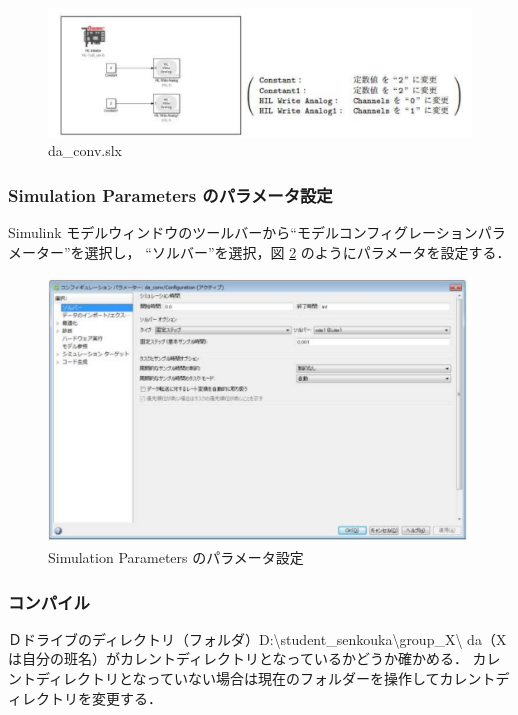     \begin{figure}[H]
        \centering
        \includegraphics[width=0.8\linewidth]{figure/da_conv.pdf}
        \caption{da\_conv.slx}
        \label{fig:da_conv}
    \end{figure}
    
    \subsubsection{Simulation Parameters のパラメータ設定}

    Simulink モデルウィンドウのツールバーから``モデルコンフィグレーションパラメーター''を選択し，
    ``ソルバー''を選択，図 \ref{fig:sim_param} のようにパラメータを設定する．
    
    \begin{figure}[H]
        \centering
        \includegraphics[width=0.8\linewidth]{figure/sim_param.pdf}
        \caption{Simulation Parameters のパラメータ設定}
        \label{fig:sim_param}
    \end{figure}
    
    \subsubsection{コンパイル}
    Ｄドライブのディレクトリ（フォルダ）D:\textbackslash student\_senkouka\textbackslash group\_X\textbackslash 
    da（Xは自分の班名）がカレントディレクトリとなっているかどうか確かめる．
    カレントディレクトリとなっていない場合は現在のフォルダーを操作してカレントディレクトリを変更する．
    
